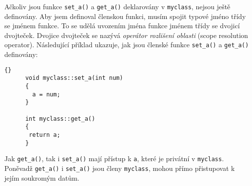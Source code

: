       Ačkoliv jsou funkce \lstinline[basicstyle=\ttfamily]!set_a()! a 
      \lstinline[basicstyle=\ttfamily]!get_a()!  deklarovány v 
      \lstinline[basicstyle=\ttfamily]!myclass!, nejsou ještě definovány. Aby jsem definoval 
      členskou funkci, musím spojit typové jméno třídy se jménem funkce. To se udělá uvozením jména 
      funkce jménem třídy se dvojicí dvojteček. Dvojice dvojteček se nazývá \textit{operátor 
      rozlišení oblasti} (scope resolution operator). Následující příklad ukazuje, jak jsou členské 
      funkce \lstinline[basicstyle=\ttfamily]!set_a()! a    
      \lstinline[basicstyle=\ttfamily]!get_a()! definovány:
      \begin{lstlisting}{}
      void myclass::set_a(int num)
      {
        a = num;
      }
  
      int myclass::get_a()
      {
       return a;
      }
      \end{lstlisting}
      Jak \lstinline[basicstyle=\ttfamily]!get_a()!, tak i 
      \lstinline[basicstyle=\ttfamily]!set_a()! 
      mají přístup k \lstinline[basicstyle=\ttfamily]!a!, které je privátní v 
      \lstinline[basicstyle=\ttfamily]!myclass!. Poněvadž
      \lstinline[basicstyle=\ttfamily]!get_a()! i \lstinline[basicstyle=\ttfamily]!set_a()! jsou 
      členy \lstinline[basicstyle=\ttfamily]!myclass!, mohou přímo přistupovat k jejím soukromým 
      datům.
  
